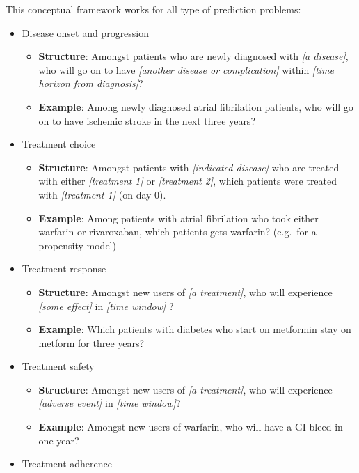 \documentclass[11pt]{book}
\providecommand{\tightlist}{%
  \setlength{\itemsep}{0pt}\setlength{\parskip}{0pt}}
\begin{document}
This conceptual framework works for all type of prediction problems:

\begin{itemize}
\tightlist
\item
  Disease onset and progression

  \begin{itemize}
  \tightlist
  \item
    \textbf{Structure}: Amongst patients who are newly diagnosed with
    \emph{{[}a disease{]}}, who will go on to have \emph{{[}another
    disease or complication{]}} within \emph{{[}time horizon from
    diagnosis{]}}?
  \item
    \textbf{Example}: Among newly diagnosed atrial fibrilation patients,
    who will go on to have ischemic stroke in the next three years?
  \end{itemize}
\item
  Treatment choice

  \begin{itemize}
  \tightlist
  \item
    \textbf{Structure}: Amongst patients with \emph{{[}indicated
    disease{]}} who are treated with either \emph{{[}treatment 1{]}} or
    \emph{{[}treatment 2{]}}, which patients were treated with
    \emph{{[}treatment 1{]}} (on day 0).
  \item
    \textbf{Example}: Among patients with atrial fibrilation who took
    either warfarin or rivaroxaban, which patients gets warfarin?
    (e.g.~for a propensity model)
  \end{itemize}
\item
  Treatment response

  \begin{itemize}
  \tightlist
  \item
    \textbf{Structure}: Amongst new users of \emph{{[}a treatment{]}},
    who will experience \emph{{[}some effect{]}} in \emph{{[}time
    window{]}} ?
  \item
    \textbf{Example}: Which patients with diabetes who start on
    metformin stay on metform for three years?
  \end{itemize}
\item
  Treatment safety

  \begin{itemize}
  \tightlist
  \item
    \textbf{Structure}: Amongst new users of \emph{{[}a treatment{]}},
    who will experience \emph{{[}adverse event{]}} in \emph{{[}time
    window{]}}?
  \item
    \textbf{Example}: Amongst new users of warfarin, who will have a GI
    bleed in one year?
  \end{itemize}
\item
  Treatment adherence


\end{itemize}
\end{document}
